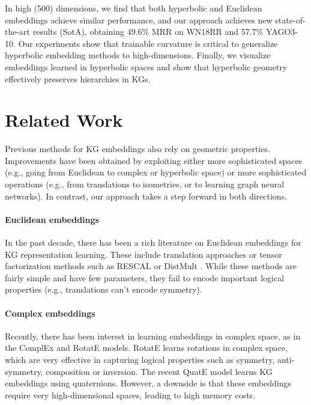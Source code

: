 \documentclass[11pt,a4paper]{article}
\newcommand{\kg}{\textsc{KG}{}}
\begin{document}
In high (500) dimensions, we find that both hyperbolic and Euclidean embeddings achieve similar performance, and our approach achieves new state-of-the-art results (SotA), obtaining 49.6\% MRR on WN18RR and 57.7\% YAGO3-10. 
Our experiments show that trainable curvature is critical to generalize hyperbolic embedding methods to high-dimensions.
Finally, we visualize embeddings learned in hyperbolic spaces and show that hyperbolic geometry effectively preserves hierarchies in KGs.  
\section{Related Work}
Previous methods for KG embeddings also rely on geometric properties. 
Improvements have been obtained by exploiting either more sophisticated spaces (e.g., going from Euclidean to complex or hyperbolic space) or more sophisticated operations (e.g., from translations to isometries, or to learning graph neural networks). In contrast, our approach takes a step forward in both directions.

\paragraph{Euclidean embeddings} 
In the past decade, there has been a rich literature on Euclidean embeddings for \kg{} representation learning. 
These include translation approaches \cite{bordes2013translating,ji2015knowledge,wang2014knowledge,lin2015learning} or tensor factorization methods such as RESCAL \cite{nickel2011three} or DistMult \cite{yang2014embedding}. 
While these methods are fairly simple and have few parameters, they fail to encode important logical properties (e.g., translations can't encode symmetry).

\paragraph{Complex embeddings} 
Recently, there has been interest in learning embeddings in complex space, as in the {ComplEx} \cite{trouillon2016complex} and {RotatE} \cite{sun2019rotate} models. 
{RotatE} learns rotations in complex space, which are very effective in capturing logical properties such as symmetry, anti-symmetry, composition or inversion. 
The recent QuatE model \cite{zhang2019quaternion} learns KG embeddings using quaternions. However, a downside is that these embeddings require very high-dimensional spaces, leading to high memory costs. 
\end{document}
